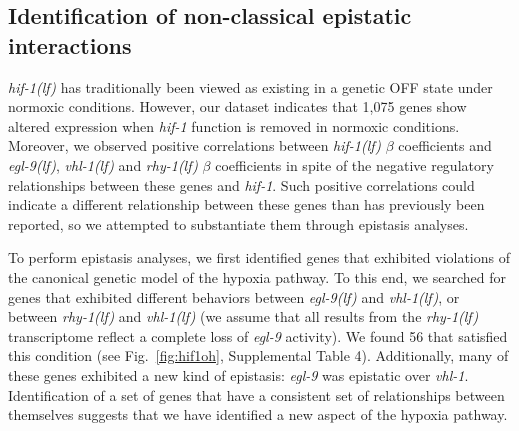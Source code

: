 \documentclass[10pt, onecolumn]{article}
\newcommand{\gene}[1]{\emph{#1}}
\newcommand{\egl}{\emph{\mbox{egl-9}(lf)}}
\newcommand{\rhy}{\emph{\mbox{rhy-1}(lf)}}
\newcommand{\vhl}{\emph{\mbox{vhl-1}(lf)}}
\newcommand{\hif}{\emph{\mbox{hif-1(lf)}}}
\newcommand{\hifn}{1,075}
\newcommand{\hifohtargets}{56}
\begin{document}
\subsection*{Identification of non-classical epistatic interactions}
\label{sub:hifoh}
\hif{} has traditionally been viewed as existing in a genetic OFF state under
normoxic conditions. However, our dataset indicates that \hifn{} genes show
altered expression when \gene{hif-1} function is removed in normoxic conditions.
Moreover, we observed positive correlations between \hif{} $\beta$ coefficients
and \egl{}, \vhl{} and \rhy{} $\beta$ coefficients in spite of the negative
regulatory relationships between these genes and \gene{hif-1}. Such positive
correlations could indicate a different relationship between these genes than has
previously been reported, so we attempted to substantiate them through epistasis
analyses.

To perform epistasis analyses, we first identified genes that exhibited violations
of the canonical genetic model of the hypoxia pathway. To this end, we searched
for genes that exhibited different behaviors between \egl{} and \vhl{}, or
between \rhy{} and \vhl{} (we assume that all results from the \rhy{}
transcriptome reflect a complete loss of \gene{egl-9} activity). We found
\hifohtargets{} that satisfied this condition (see Fig.~\ref{fig:hif1oh},
Supplemental Table 4). Additionally, many of these genes exhibited a new kind of
epistasis: \gene{egl-9} was epistatic over \gene{vhl-1}. Identification of a set
of genes that have a consistent set of relationships between themselves suggests
that we have identified a new aspect of the hypoxia pathway.
\end{document}
